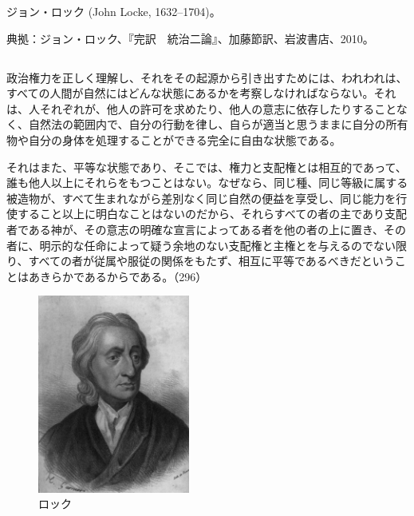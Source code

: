 

ジョン・ロック (John Locke, 1632--1704)。


典拠：ジョン・ロック、『完訳　統治二論』、加藤節訳、岩波書店、2010。


\subsection{}


政治権力を正しく理解し、それをその起源から引き出すためには、われわれは、すべての人間が自然にはどんな状態にあるかを考察しなければならない。それは、人それぞれが、他人の許可を求めたり、他人の意志に依存したりすることなく、自然法の範囲内で、自分の行動を律し、自らが適当と思うままに自分の所有物や自分の身体を処理することができる完全に自由な状態である。

それはまた、平等な状態であり、そこでは、権力と支配権とは相互的であって、誰も他人以上にそれらをもつことはない。なぜなら、同じ種、同じ等級に属する被造物が、すべて生まれながら差別なく同じ自然の便益を享受し、同じ能力を行使すること以上に明白なことはないのだから、それらすべての者の主であり支配者である神が、その意志の明確な宣言によってある者を他の者の上に置き、その者に、明示的な任命によって疑う余地のない支配権と主権とを与えるのでない限り、すべての者が従属や服従の関係をもたず、相互に平等であるべきだということはあきらかであるからである。（296）





\begin{figure}[htbp]
  \centering
     \includegraphics[width=50mm]{images/Locke-John-LOC.jpg}
     \caption{ロック} 

\end{figure}


